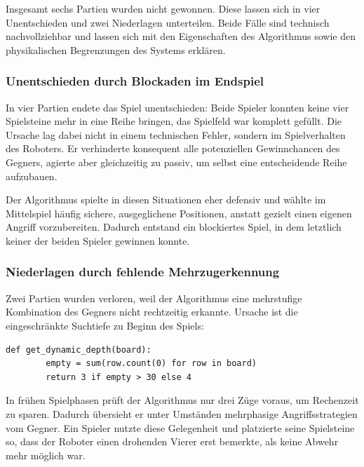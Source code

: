 Insgesamt sechs Partien wurden nicht gewonnen. Diese lassen sich in vier Unentschieden und zwei Niederlagen unterteilen. Beide Fälle sind technisch nachvollziehbar und lassen sich mit den Eigenschaften des Algorithmus sowie den physikalischen Begrenzungen des Systems erklären.

\subsubsection{Unentschieden durch Blockaden im Endspiel}

In vier Partien endete das Spiel unentschieden: Beide Spieler konnten keine vier Spielsteine mehr in eine Reihe bringen, das Spielfeld war komplett gefüllt. Die Ursache lag dabei nicht in einem technischen Fehler, sondern im Spielverhalten des Roboters. Er verhinderte konsequent alle potenziellen Gewinnchancen des Gegners, agierte aber gleichzeitig zu passiv, um selbst eine entscheidende Reihe aufzubauen.

Der Algorithmus spielte in diesen Situationen eher defensiv und wählte im Mittelspiel häufig sichere, ausgeglichene Positionen, anstatt gezielt einen eigenen Angriff vorzubereiten. Dadurch entstand ein blockiertes Spiel, in dem letztlich keiner der beiden Spieler gewinnen konnte.

\subsubsection{Niederlagen durch fehlende Mehrzugerkennung}

Zwei Partien wurden verloren, weil der Algorithmus eine mehrstufige Kombination des Gegners nicht rechtzeitig erkannte. Ursache ist die eingeschränkte Suchtiefe zu Beginn des Spiels:

\begin{lstlisting}[style=pythonstyle]
	def get_dynamic_depth(board):
		empty = sum(row.count(0) for row in board)
		return 3 if empty > 30 else 4
\end{lstlisting}

In frühen Spielphasen prüft der Algorithmus nur drei Züge voraus, um Rechenzeit zu sparen. Dadurch übersieht er unter Umständen mehrphasige Angriffsstrategien vom Gegner. Ein Spieler nutzte diese Gelegenheit und platzierte seine Spielsteine so, dass der Roboter einen drohenden Vierer erst bemerkte, als keine Abwehr mehr möglich war.




